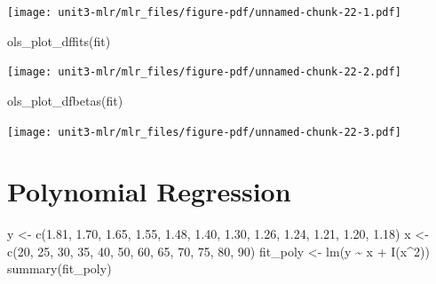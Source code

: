 \documentclass[
  letterpaper,
]{scrbook}
\newenvironment{Shaded}{\begin{snugshade}}{\end{snugshade}}
\newcommand{\DecValTok}[1]{\textcolor[rgb]{0.68,0.00,0.00}{#1}}
\newcommand{\FloatTok}[1]{\textcolor[rgb]{0.68,0.00,0.00}{#1}}
\newcommand{\FunctionTok}[1]{\textcolor[rgb]{0.28,0.35,0.67}{#1}}
\newcommand{\NormalTok}[1]{\textcolor[rgb]{0.00,0.23,0.31}{#1}}
\newcommand{\OtherTok}[1]{\textcolor[rgb]{0.00,0.23,0.31}{#1}}
\newcommand{\SpecialCharTok}[1]{\textcolor[rgb]{0.37,0.37,0.37}{#1}}
\begin{document}
\texttt{[image: unit3-mlr/mlr\_files/figure-pdf/unnamed-chunk-22-1.pdf]}

\begin{Shaded}
\begin{Highlighting}[]
\FunctionTok{ols\_plot\_dffits}\NormalTok{(fit)}
\end{Highlighting}
\end{Shaded}

\texttt{[image: unit3-mlr/mlr\_files/figure-pdf/unnamed-chunk-22-2.pdf]}

\begin{Shaded}
\begin{Highlighting}[]
\FunctionTok{ols\_plot\_dfbetas}\NormalTok{(fit)}
\end{Highlighting}
\end{Shaded}

\texttt{[image: unit3-mlr/mlr\_files/figure-pdf/unnamed-chunk-22-3.pdf]}

\section{Polynomial Regression}\label{polynomial-regression}

\begin{Shaded}
\begin{Highlighting}[]
\NormalTok{y }\OtherTok{\textless{}{-}} \FunctionTok{c}\NormalTok{(}\FloatTok{1.81}\NormalTok{, }\FloatTok{1.70}\NormalTok{, }\FloatTok{1.65}\NormalTok{, }\FloatTok{1.55}\NormalTok{, }\FloatTok{1.48}\NormalTok{, }\FloatTok{1.40}\NormalTok{, }\FloatTok{1.30}\NormalTok{, }\FloatTok{1.26}\NormalTok{, }\FloatTok{1.24}\NormalTok{, }\FloatTok{1.21}\NormalTok{, }\FloatTok{1.20}\NormalTok{, }\FloatTok{1.18}\NormalTok{)}
\NormalTok{x }\OtherTok{\textless{}{-}} \FunctionTok{c}\NormalTok{(}\DecValTok{20}\NormalTok{, }\DecValTok{25}\NormalTok{, }\DecValTok{30}\NormalTok{, }\DecValTok{35}\NormalTok{, }\DecValTok{40}\NormalTok{, }\DecValTok{50}\NormalTok{, }\DecValTok{60}\NormalTok{, }\DecValTok{65}\NormalTok{, }\DecValTok{70}\NormalTok{, }\DecValTok{75}\NormalTok{, }\DecValTok{80}\NormalTok{, }\DecValTok{90}\NormalTok{)}
\NormalTok{fit\_poly }\OtherTok{\textless{}{-}} \FunctionTok{lm}\NormalTok{(y }\SpecialCharTok{\textasciitilde{}}\NormalTok{ x }\SpecialCharTok{+} \FunctionTok{I}\NormalTok{(x}\SpecialCharTok{\^{}}\DecValTok{2}\NormalTok{))}
\FunctionTok{summary}\NormalTok{(fit\_poly)}
\end{Highlighting}
\end{Shaded}
\end{document}
